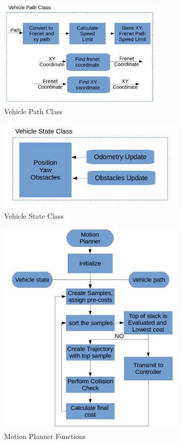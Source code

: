\begin{figure}
	\centering
	\includegraphics[width=0.7\textwidth]{Images/implementation/vehicle_path.png}
	\caption{Vehicle Path Class}
	\label{vehicle_path_class}
\end{figure}

\begin{figure}
	\centering
	\includegraphics[width=0.8\textwidth]{Images/implementation/vehicle_state.png}
	\caption{Vehicle State Class}
	\label{vehicle_state_class}
\end{figure}

\begin{figure}
	\centering
	\includegraphics[width=0.8\textwidth]{Images/implementation/motion_planner.png}
	\caption{Motion Planner Functions}
	\label{motion_planner_class}
\end{figure}






